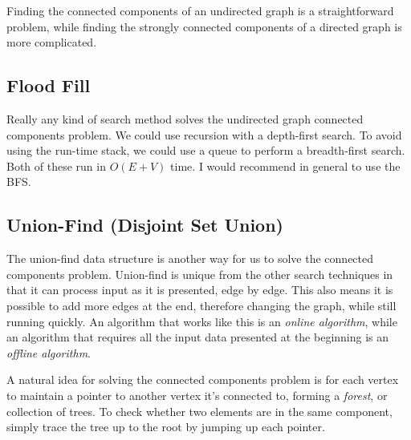 Finding the connected components of an undirected graph is a straightforward problem, while finding the strongly connected components of a directed graph is more complicated.

\subsection{Flood Fill}

Really any kind of search method solves the undirected graph connected components problem. We could use recursion with a depth-first search. To avoid using the run-time stack, we could use a queue to perform a breadth-first search. Both of these run in $O(E+V)$ time. I would recommend in general to use the BFS.

\subsection{Union-Find (Disjoint Set Union)}

The union-find data structure is another way for us to solve the connected components problem. Union-find is unique from the other search techniques in that it can process input as it is presented, edge by edge. This also means it is possible to add more edges at the end, therefore changing the graph, while still running quickly. An algorithm that works like this is an \textit{online algorithm}, while an algorithm that requires all the input data presented at the beginning is an \textit{offline algorithm}.

A natural idea for solving the connected components problem is for each vertex to maintain a pointer to another vertex it's connected to, forming a \textit{forest}, or collection of trees. To check whether two elements are in the same component, simply trace the tree up to the root by jumping up each pointer.

\begin{center}
\end{center}

